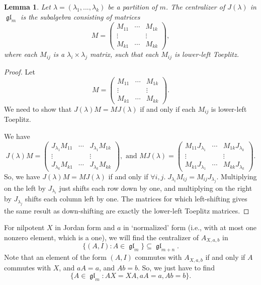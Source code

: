 \documentclass[12pt,psamsfonts]{article}
\DeclareMathOperator{\gl}{\mathfrak{gl}}
\newtheorem{lemma}[theorem]{Lemma}
\begin{document}
\begin{lemma}
    Let \(\lambda = (\lambda_1, ..., \lambda_k)\) be a partition of \(m\).
    The centralizer of \(J(\lambda)\) in \(\gl_m\) is the subalgebra consisting of matrices 
    \[M = \begin{pmatrix}
        M_{11} & \cdots & M_{1k}\\
        \vdots &        & \vdots\\
        M_{k1} & \cdots & M_{kk}
    \end{pmatrix},\]
    where each \(M_{ij}\) is a \(\lambda_i \times \lambda_j\) matrix, such that each \(M_{ij}\) is lower-left Toeplitz.
\end{lemma}
\begin{proof}
    Let 
    \[M = \begin{pmatrix}
        M_{11} & \cdots & M_{1k}\\
        \vdots &        & \vdots\\
        M_{k1} & \cdots & M_{kk}
    \end{pmatrix}.\]
    We need to show that \(J(\lambda)M = MJ(\lambda)\) if and only if each \(M_{ij}\) is lower-left Toeplitz.
    \par We have 
    \[J(\lambda)M = \begin{pmatrix}
        J_{\lambda_1}M_{11} & \cdots & J_{\lambda_1}M_{1k}\\
        \vdots & & \vdots\\
        J_{\lambda_k}M_{k1} & \cdots & J_{\lambda_k}M_{kk}
    \end{pmatrix}, \textrm{ and } MJ(\lambda) = \begin{pmatrix}
        M_{11} J_{\lambda_1} & \cdots & M_{1k} J_{\lambda_k}\\
        \vdots & & \vdots\\
        M_{k1} J_{\lambda_1} & \cdots & M_{kk} J_{\lambda_k}
    \end{pmatrix}.\]
    So, we have \(J(\lambda)M = MJ(\lambda)\) if and only if \(\forall i,j. \; J_{\lambda_i} M_{ij} = M_{ij} J_{\lambda_j}\).
    Multiplying on the left by \(J_{\lambda_i}\) just shifts each row down by one, and multiplying on the right by \(J_{\lambda_j}\) shifts each column left by one.
    The matrices for which left-shifting gives the same result as down-shifting are exactly the lower-left Toeplitz matrices.
\end{proof}
For nilpotent \(X\) in Jordan form and \(a\) in `normalized' form (i.e., with at most one nonzero element, which is a one), we will find the centralizer of \(A_{X, a, b}\) in 
\[\{(A, I) : A \in \gl_m\} \subseteq \gl_{m + n}.\]
Note that an element of the form \((A, I)\) commutes with \(A_{X, a, b}\) if and only if \(A\) commutes with \(X\), and \(aA = a\), and \(Ab = b\).
So, we just have to find 
\[\{A \in \gl_m : AX = XA, aA = a, Ab = b\}.\]
\end{document}
